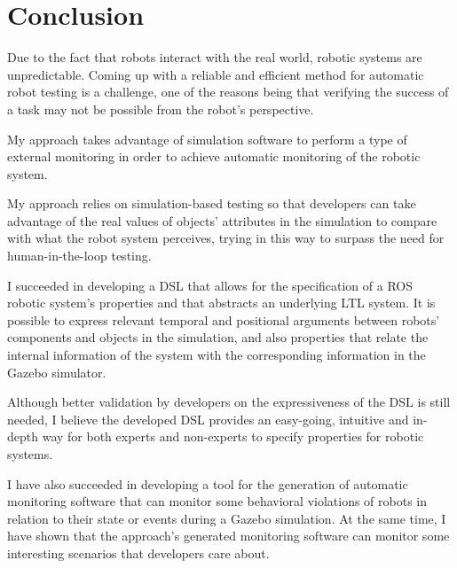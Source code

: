 \chapter{Conclusion}
\label{chap:conclusion}


Due to the fact that robots interact with the real world, robotic systems are unpredictable. Coming up with a reliable and efficient method for automatic robot testing is a challenge, one of the reasons being that verifying the success of a task may not be possible from the robot's perspective. 

My approach takes advantage of simulation software to perform a type of external monitoring in order to achieve automatic monitoring of the robotic system. 

My approach relies on simulation-based testing so that developers can take advantage of the real values of objects' attributes in the simulation to compare with what the robot system perceives, trying in this way to surpass the need for human-in-the-loop testing.

I succeeded in developing a DSL that allows for the specification of a ROS robotic system's properties and that abstracts an underlying LTL system. It is possible to express relevant temporal and positional arguments between robots' components and objects in the simulation, and also properties that relate the internal information of the system with the corresponding information in the Gazebo simulator.

Although better validation by developers on the expressiveness of the DSL is still needed, I believe the developed DSL provides an easy-going, intuitive and in-depth way for both experts and non-experts to specify properties for robotic systems.

I have also succeeded in developing a tool for the generation of automatic monitoring software that can monitor some behavioral violations of robots in relation to their state or events during a Gazebo simulation. At the same time, I have shown that the approach's generated monitoring software can monitor some interesting scenarios that developers care about. 

